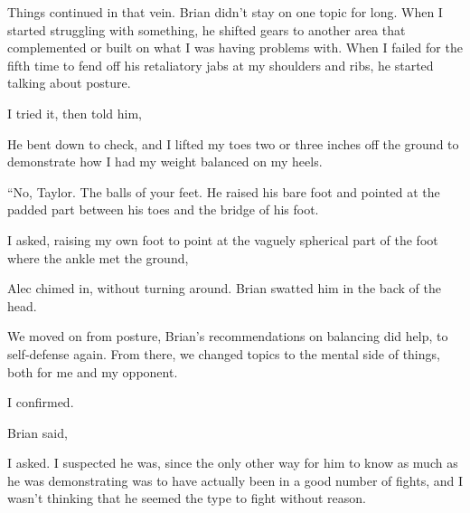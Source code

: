 Things continued in that vein. Brian didn't stay on one topic for long. When I started struggling with something, he shifted gears to another area that complemented or built on what I was having problems with. When I failed for the fifth time to fend off his retaliatory jabs at my shoulders and ribs, he started talking about posture.


I tried it, then told him, 

He bent down to check, and I lifted my toes two or three inches off the ground to demonstrate how I had my weight balanced on my heels.

“No, Taylor. The balls of your feet. He raised his bare foot and pointed at the padded part between his toes and the bridge of his foot.

 I asked, raising my own foot to point at the vaguely spherical part of the foot where the ankle met the ground, 

 Alec chimed in, without turning around. Brian swatted him in the back of the head.

We moved on from posture, Brian's recommendations on balancing did help, to self-defense again. From there, we changed topics to the mental side of things, both for me and my opponent.

 I confirmed.

 Brian said, 



 I asked. I suspected he was, since the only other way for him to know as much as he was demonstrating was to have actually been in a good number of fights, and I wasn't thinking that he seemed the type to fight without reason.

